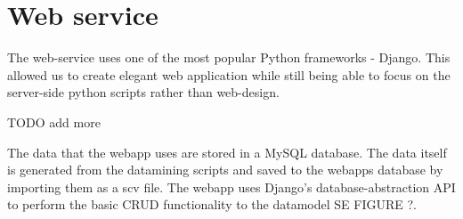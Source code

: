 \documentclass[10pt]{IEEEtran}
\begin{document}
\section{Web service}

The web-service uses one of the most popular Python frameworks - Django. This allowed us to create elegant web application while still being able to focus on the server-side python scripts rather than web-design.

TODO add more 

The data that the webapp uses are stored in a MySQL database.
The data itself is generated from the datamining scripts and saved to the webapps database by importing them as a scv file.
The webapp uses Django's database-abstraction API to perform the basic CRUD functionality to the datamodel SE FIGURE ?.
 
\end{document}
